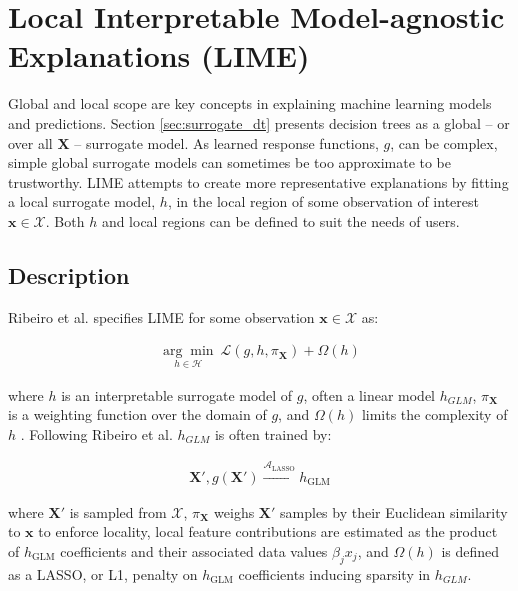 \documentclass[sigconf, review]{acmart}
\begin{document}
\section{Local Interpretable Model-agnostic Explanations (LIME)}
\label{sec:lime}

Global and local scope are key concepts in explaining machine learning models and predictions. Section \ref{sec:surrogate_dt} presents decision trees as a global -- or over all $\mathbf{X}$ -- surrogate model. As learned response functions, $g$, can be complex, simple global surrogate models can sometimes be too approximate to be trustworthy. LIME attempts to create more representative explanations by fitting a local surrogate model, $h$, in the local region of some observation of interest $\mathbf{x} \in \mathcal{X}$. Both $h$ and local regions can be defined to suit the needs of users.

\subsection{Description}

Ribeiro et al. specifies LIME for some observation $\mathbf{x} \in \mathcal{X}$ as:

\begin{equation}
\begin{aligned}
\underset{h \in \mathcal{H}}{\arg\min}\:\mathcal{L}(g, h, \pi_{\mathbf{X}}) + \Omega(h)
\end{aligned}
\end{equation}

\noindent where $h$ is an interpretable surrogate model of $g$, often a linear model $h_{GLM}$, $\pi_{\mathbf{X}}$ is a weighting function over the domain of $g$, and $\Omega(h)$ limits the complexity of $h$ \cite{lime}. Following Ribeiro et al. $h_{GLM}$ is often trained by:

\begin{equation}
\begin{aligned}
\mathbf{X}', g(\mathbf{X}') \xrightarrow{\mathcal{A}_{\text{LASSO}}} h_{\text{GLM}}
\end{aligned}
\end{equation}

\noindent where $\mathbf{X}'$ is sampled from $\mathcal{X}$, $\pi_{\mathbf{X}}$ weighs $\mathbf{X}'$ samples by their Euclidean similarity to $\mathbf{x}$ to enforce locality, local feature contributions are estimated as the product of $h_{\text{GLM}}$ coefficients and their associated data values $\beta_j x_j$, and $\Omega(h)$ is defined as a LASSO, or L1, penalty on $h_{\text{GLM}}$ coefficients inducing sparsity in $h_{GLM}$. 		
\end{document}
